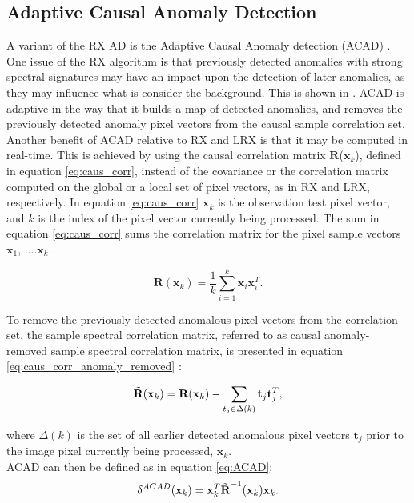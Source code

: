 \subsection{Adaptive Causal Anomaly Detection}
\label{sec:ACAD_theory}
A variant of the RX AD is the Adaptive Causal Anomaly detection (ACAD) \cite{chang2006characterization}. One issue of the RX algorithm is that previously detected anomalies with strong spectral signatures may have an impact upon the detection of later anomalies, as they may influence what is consider the background. This is shown in \cite{chang2006characterization}. ACAD is adaptive in the way that it builds a map of detected anomalies, and removes the previously detected anomaly pixel vectors from the causal sample correlation set. \\
Another benefit of ACAD relative to RX and LRX is that it may be computed in real-time. This is achieved by using the causal correlation matrix $\textbf{R}$($\textbf{x}_k$), defined in equation \ref{eq:caus_corr}, instead of the covariance or the correlation matrix computed on the global or a local set of pixel vectors, as in RX and LRX, respectively. In equation \ref{eq:caus_corr} $\textbf{x}_k$ is the observation test pixel vector, and $k$ is the index of the pixel vector currently being processed. The sum in equation \ref{eq:caus_corr} sums the correlation matrix for the pixel sample vectors {$\textbf{x}_1$, ....$\textbf{x}_k$}.  

\begin{equation}
    \textbf{R}(\textbf{x}_k)=\frac{1}{k}\sum_{i=1}^k\textbf{x}_i\textbf{x}_i^T. 
    \label{eq:caus_corr}
\end{equation}

To remove the previously detected anomalous pixel vectors from the correlation set, the sample spectral correlation matrix, referred to as causal anomaly-removed sample spectral correlation matrix, is presented in equation \ref{eq:caus_corr_anomaly_removed}  \cite{chang2006characterization}:

\begin{equation}
    \Tilde{\textbf{R}}(\textbf{x}_k)= \textbf{R}(\textbf{x}_k) - \sum_{t_j\in\Delta(k)}\textbf{t}_j\textbf{t}_j^T ,
    \label{eq:caus_corr_anomaly_removed}
\end{equation}

where $\Delta(k)$ is the set of all earlier detected anomalous pixel vectors $\textbf{t}_j$ prior to the image pixel currently being processed, $\textbf{x}_k$.
\\
ACAD can then be defined as in equation \ref{eq:ACAD}:
\begin{equation}
    \delta^{ACAD}(\textbf{x}_k)= \textbf{x}_k^T\Tilde{\textbf{R}}^{-1}(\textbf{x}_k)\textbf{x}_k.
    \label{eq:ACAD}
\end{equation}

